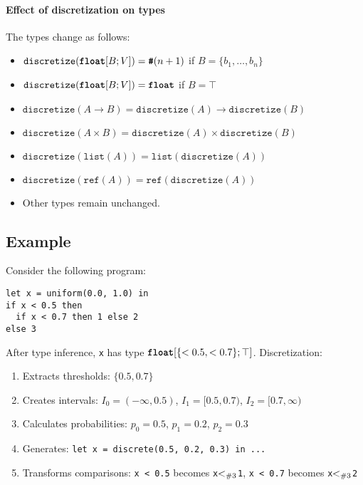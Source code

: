 \paragraph{Effect of discretization on types} The types change as follows:
\begin{itemize}
    \item $\texttt{discretize}(\textnormal{\ttfamily\bfseries float}[B; V]) = \textnormal{\ttfamily\bfseries \#}(n+1)$ if $B = \{b_1, \ldots, b_n\}$
    \item $\texttt{discretize}(\textnormal{\ttfamily\bfseries float}[B; V]) = \textnormal{\ttfamily\bfseries float}$ if $B = \top$
    \item $\texttt{discretize}(A \to B) = \texttt{discretize}(A) \to \texttt{discretize}(B)$
    \item $\texttt{discretize}(A \times B) = \texttt{discretize}(A) \times \texttt{discretize}(B)$
    \item $\texttt{discretize}(\texttt{list}(A)) = \texttt{list}(\texttt{discretize}(A))$
    \item $\texttt{discretize}(\texttt{ref}(A)) = \texttt{ref}(\texttt{discretize}(A))$
    \item Other types remain unchanged.
\end{itemize}


\subsection{Example}

Consider the following program:
\begin{lstlisting}
let x = uniform(0.0, 1.0) in
if x < 0.5 then 
  if x < 0.7 then 1 else 2
else 3
\end{lstlisting}

After type inference, \texttt{x} has type $\textnormal{\ttfamily\bfseries float}[\{<0.5, <0.7\}; \top]$. Discretization:
\begin{enumerate}
    \item Extracts thresholds: $\{0.5, 0.7\}$
    \item Creates intervals: $I_0 = (-\infty, 0.5)$, $I_1 = [0.5, 0.7)$, $I_2 = [0.7, \infty)$
    \item Calculates probabilities: $p_0 = 0.5$, $p_1 = 0.2$, $p_2 = 0.3$
    \item Generates: \texttt{let x = discrete(0.5, 0.2, 0.3) in ...}
    \item Transforms comparisons: \texttt{x < 0.5} becomes \texttt{x}$<_{\#{3}}$\texttt{1}, \texttt{x < 0.7} becomes \texttt{x}$<_{\#{3}}$\texttt{2}
\end{enumerate}


